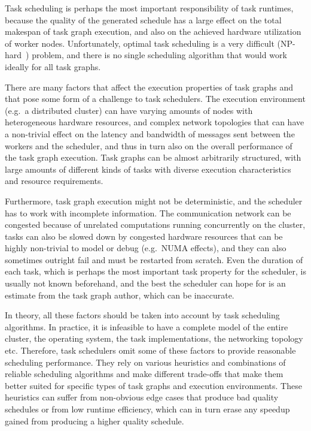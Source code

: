 
Task scheduling is perhaps the most important responsibility of task runtimes, because the quality
of the generated schedule has a large effect on the total makespan of task graph execution, and
also on the achieved hardware utilization of worker nodes. Unfortunately, optimal task scheduling
is a very difficult (NP-hard~\cite{Ullman1975}) problem, and there is no single scheduling
algorithm that would work ideally for all task graphs.

There are many factors that affect the execution properties of task graphs and that pose some form
of a challenge to task schedulers. The execution environment (e.g.\ a distributed cluster) can have
varying amounts of nodes with heterogeneous hardware resources, and complex network topologies that
can have a non-trivial effect on the latency and bandwidth of messages sent between the workers and
the scheduler, and thus in turn also on the overall performance of the task graph execution. Task
graphs can be almost arbitrarily structured, with large amounts of different kinds of tasks with
diverse execution characteristics and resource requirements.

Furthermore, task graph execution might not be deterministic, and the scheduler has to work with
incomplete information. The communication network can be congested because of unrelated
computations running concurrently on the cluster, tasks can also be slowed down by congested
hardware resources that can be highly non-trivial to model or debug (e.g.\ NUMA effects), and they
can also sometimes outright fail and must be restarted from scratch. Even the duration of each
task, which is perhaps the most important task property for the scheduler, is usually not known
beforehand, and the best the scheduler can hope for is an estimate from the task graph author,
which can be inaccurate.

In theory, all these factors should be taken into account by task scheduling algorithms. In
practice, it is infeasible to have a complete model of the entire cluster, the operating system,
the task implementations, the networking topology etc. Therefore, task schedulers omit some of
these factors to provide reasonable scheduling performance. They rely on various heuristics and
combinations of reliable scheduling algorithms and make different trade-offs that make them better
suited for specific types of task graphs and execution environments. These heuristics can suffer
from non-obvious edge cases that produce bad quality schedules or from low runtime efficiency,
which can in turn erase any speedup gained from producing a higher quality schedule.

